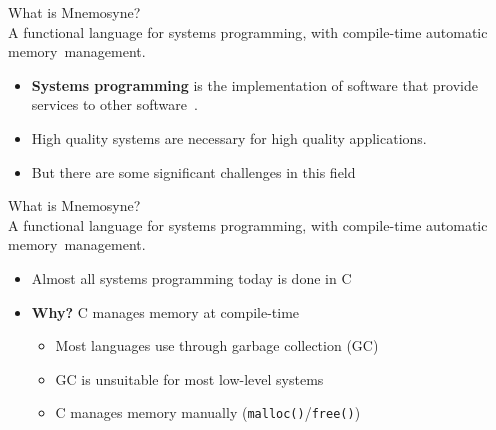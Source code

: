 \documentclass{beamer}
\begin{document}
\begin{frame}
\alert{\huge{What is Mnemosyne?}}\\
\large{A functional language \alert{for systems programming}, with compile-time automatic memory~management.}
\normalsize
\begin{itemize}
\item<1->
    \textbf{Systems programming} is the implementation of software that provide services to other software~\cite{Narten:2003:SP:1074100.1074850,Shapiro:2006:PLC:1215995.1216004}.
    \item <2-> High quality systems are necessary for high quality applications.
\item <3-> But there are some significant challenges in this field~\cite{whyrust,Shapiro:2006:PLC:1215995.1216004}
\end{itemize}
\end{frame}

\begin{frame}
\alert{\huge{What is Mnemosyne?}}\\
\large{A functional language for systems programming, \alert{with compile-time automatic memory~management}.}\normalsize
\begin{itemize}
\item Almost all
systems
programming today is done in C~\cite{Shapiro:2006:PLC:1215995.1216004,hawblitzel2004low}

    \item<2-> \textbf{Why?} C manages memory at compile-time
    \begin{itemize}
        \item<3-> Most languages use through garbage collection (GC)~\cite{Bartley:2003:GC:1074100.1074419}
        \item<3-> GC is unsuitable for most low-level systems~\cite{hawblitzel2004low,Shapiro:2006:PLC:1215995.1216004,Hertz:2005:QPG:1094811.1094836}
        \item<3-> C manages memory manually (\texttt{malloc()}/\texttt{free()})~\cite{Shapiro:2006:PLC:1215995.1216004,kernighan1988c,Hertz:2005:QPG:1094811.1094836}
    \end{itemize}
\end{itemize}
\end{frame}
\end{document}
